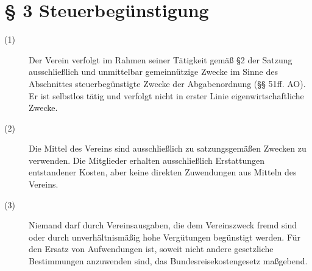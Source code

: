 \documentclass[a4paper,12pt]{scrartcl}
\begin{document}
\section*{\S{} 3 Steuerbegünstigung}
\begin{description} 

\item[(1)] Der Verein verfolgt im Rahmen seiner Tätigkeit gemäß §2 der Satzung ausschließlich und unmittelbar gemeinnützige Zwecke im Sinne des Abschnittes steuerbegünstigte Zwecke der Abgabenordnung (§§ 51ff. AO). Er ist selbstlos tätig und verfolgt nicht in erster Linie eigenwirtschaftliche Zwecke.

\item[(2)] Die Mittel des Vereins sind ausschließlich zu satzungsgemäßen Zwecken zu verwenden. Die Mitglieder erhalten ausschließlich Erstattungen entstandener Kosten, aber keine direkten Zuwendungen aus Mitteln des Vereins.

\item[(3)] Niemand darf durch Vereinsausgaben, die dem Vereinszweck fremd sind oder durch unverhältnismäßig hohe Vergütungen begünstigt werden. Für den Ersatz von Aufwendungen ist, soweit nicht andere gesetzliche Bestimmungen anzuwenden sind, das Bundesreisekostengesetz maßgebend.

\end{description}
\end{document}
